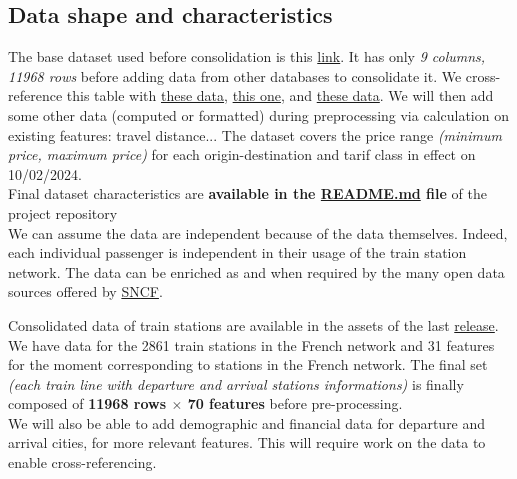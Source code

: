 \documentclass[10pt,a4paper,hidelinks]{article}
\begin{document}
\subsection{Data shape and characteristics}
The base dataset used before consolidation is this \href{https://ressources.data.sncf.com/explore/dataset/tarifs-tgv-inoui-ouigo/information/}{link}. It has only \textit{9 columns, 11968 rows} before adding data from other databases to consolidate it. We cross-reference this table with \href{https://ressources.data.sncf.com/explore/dataset/gares-pianos/information/}{these data}, \href{https://ressources.data.sncf.com/explore/dataset/gares-equipees-du-wifi/information/}{this one}, and \href{https://ressources.data.sncf.com/explore/dataset/frequentation-gares/information/}{these data}. We will then add some other data (computed or formatted) during preprocessing via calculation on existing features: travel distance... The dataset covers the price range \textit{(minimum price, maximum price)} for each origin-destination and tarif class in effect on 10/02/2024.\\

Final dataset characteristics are \textbf{available in the \href{https://github.com/pierre-jezegou/fib-ml-project/blob/main/README.md}{README.md} file} of the project repository\\

We can assume the data are independent because of the data themselves. Indeed, each individual passenger is independent in their usage of the train station network. The data can be enriched as and when required by the many open data sources offered by \href{https://ressources.data.sncf.com/}{SNCF}.

Consolidated data of train stations are available in the assets of the last \href{https://github.com/pierre-jezegou/fib-ml-project/releases/}{release}. We have data for the 2861 train stations in the French network and 31 features for the moment corresponding to stations in the French network. The final set \textit{(each train line with departure and arrival stations informations)} is finally composed of \textbf{11968 rows $\mathbf\times$ 70 features} before pre-processing.\\
We will also be able to add demographic and financial data for departure and arrival cities, for more relevant features. This will require work on the data to enable cross-referencing.
\end{document}
